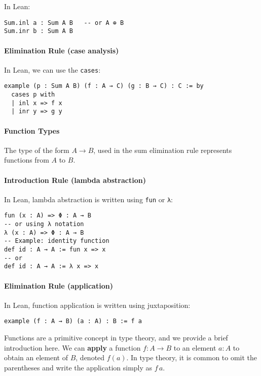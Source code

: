 \noindent In Lean:
\begin{lstlisting}[language=lean]
Sum.inl a : Sum A B   -- or A ⊕ B
Sum.inr b : Sum A B
\end{lstlisting}
\paragraph{Elimination Rule (case analysis)}
\begin{prooftree}
\end{prooftree}
In Lean, we can use the \lstinline[language=lean]|cases|:
\begin{lstlisting}[language=lean]
example (p : Sum A B) (f : A → C) (g : B → C) : C := by
  cases p with
  | inl x => f x
  | inr y => g y
\end{lstlisting}
\paragraph{Function Types}
The type of the form $A \to B$, used in the sum elimination rule
represents functions from $A$ to $B$.
\paragraph{Introduction Rule (lambda abstraction)}
\begin{prooftree}
\end{prooftree}
In Lean, lambda abstraction is written using \lstinline[language=lean]|fun| or \lstinline[language=lean]|λ|:
\begin{lstlisting}[language=lean]
fun (x : A) => Φ : A → B
-- or using λ notation
λ (x : A) => Φ : A → B
-- Example: identity function
def id : A → A := fun x => x
-- or
def id : A → A := λ x => x
\end{lstlisting}
\paragraph{Elimination Rule (application)}
\begin{prooftree}
\end{prooftree}
In Lean, function application is written using juxtaposition:
\begin{lstlisting}[language=lean]
example (f : A → B) (a : A) : B := f a
\end{lstlisting}
Functions are a primitive concept in type theory,
and we provide a brief introduction here.
We can \textbf{apply} a function $f : A \to B$
to an element $a : A$ to obtain an element of $B$,
denoted $f(a)$. In type theory, it is common to omit
the parentheses and write the application simply
as $f\, a$.

